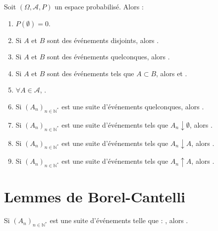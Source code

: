 \documentclass[10pt, french]{report}
\begin{document}
\begin{multicols*}{2}
\begin{definitionNOHFILLprop}
Soit $(\Omega, \mathcal{A}, P)$ un espace probabilisé. Alors : 
\begin{enumerate}[label = \alph*)]
	\item	$P(\emptyset) = 0$.
	\item	Si $A$ et $B$ sont des événements disjoints, alors .
	\item	Si $A$ et $B$ sont des événements quelconques, alors .
	\item	Si $A$ et $B$ sont des événements tels que $A \subset B$, alors  et .
	\item	$\forall A \in \mathcal{A}$, .
	\item	Si $(A_{n})_{n \in \mathbb{N}^{\ast}}$ est une suite d'événements quelconques, alors .
	\item	Si $(A_{n})_{n \in \mathbb{N}^{\ast}}$ est une suite d'événements tels que $A_{n} \downarrow \emptyset$, alors .
	\item	Si $(A_{n})_{n \in \mathbb{N}^{\ast}}$ est une suite d'événements tels que $A_{n} \downarrow A$, alors .
	\item	Si $(A_{n})_{n \in \mathbb{N}^{\ast}}$ est une suite d'événements tels que $A_{n} \uparrow A$, alors .
\end{enumerate}
\end{definitionNOHFILLprop}



\columnbreak
\section{Lemmes de Borel-Cantelli}
\begin{definitionNOHFILL}
Si $(A_{n})_{n \in \mathbb{N}^{\ast}}$ est une suite d'événements telle que : , alors .
\end{definitionNOHFILL}




\end{multicols*}
\end{document}
